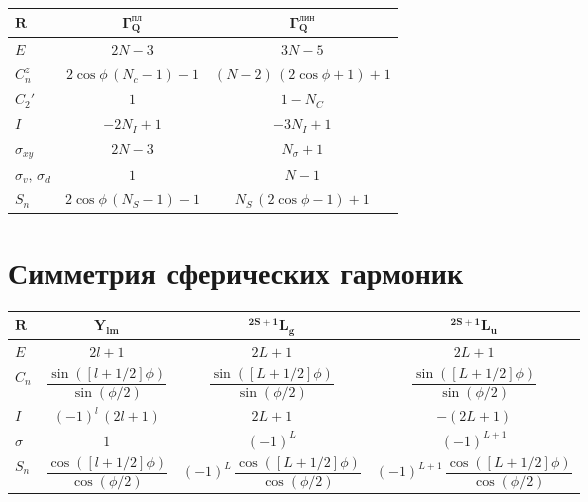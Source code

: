 \begin{center}
\begin{tabular}{ |C{1cm}|c|c| }
 \hline
 $\mathbf{R}$ & $\mathbf{\Gamma_Q^{\text{пл}}}$ & $\mathbf{\Gamma_Q^{\text{лин}}}$ \\[0.35ex] 
 \hline\hline
 $E$ & $2N-3$ & $3N-5$ \\[0.35ex]  
 \hline
 $C_n^z$ & $2\cos \phi\,(N_c-1)-1$ & $(N-2)\,(2\cos\phi+1)+1$ \\[0.35ex]
 \hline
 $C_2'$ & $1$ & $1-N_C$ \\[0.35ex]
 \hline
 $I$ & $-2N_I+1$ & $-3N_I+1$ \\[0.35ex]
 \hline
 $\sigma_{xy}$ & $2N-3$ &  $N_\sigma +1 $\\[0.35ex]
 \hline
 $\sigma_{v},\,\sigma_{d}$ & $1$ & $N-1$\\[0.35ex]
 \hline
 $S_{n}$ & $2\cos \phi\,(N_S-1)-1$ & $N_S\,(2\cos\phi-1)+1$ \\[0.35ex]
 \hline
\end{tabular}
\end{center}


\section{Симметрия сферических гармоник}

\begin{center}
\begin{tabular}{ |C{1cm}|c|c|c| }
 \hline
 $\mathbf{R}$ & $\mathbf{{Y}_{lm}}$ & $\mathbf{^{2S+1}L_g}$ & $\mathbf{^{2S+1}L_u}$ \\[1.5ex]
 \hline\hline
 $E$ & $2l+1$ & $2L+1$ & $2L+1$ \\[1.5ex]
 \hline
 $C_n$ & $\dfrac{\sin{\left( [l+1/2]\phi \right)}}{\sin(\phi/2)}$ & $\dfrac{\sin{\left( [L+1/2]\phi \right)}}{\sin(\phi/2)}$ & $\dfrac{\sin{\left( [L+1/2]\phi \right)}}{\sin(\phi/2)}$ \\[1.5ex]
 \hline
 $I$ & $(-1)^l\,(2l+1)$ & $2L+1$ & $-(2L+1)$ \\[1.5ex]
 \hline
 $\sigma$ & $1$ & $(-1)^L$ & $(-1)^{L+1}$ \\[1.5ex]
 \hline
 $S_n$ & $\dfrac{\cos{\left( [l+1/2]\phi \right)}}{\cos(\phi/2)}$ & $(-1)^L\,\dfrac{\cos{\left( [L+1/2]\phi \right)}}{\cos(\phi/2)}$ & $(-1)^{L+1}\,\dfrac{\cos{\left( [L+1/2]\phi \right)}}{\cos(\phi/2)}$  \\[1.5ex]
 \hline
\end{tabular}
\end{center}

